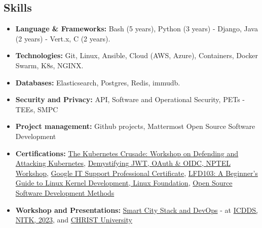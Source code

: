 \documentclass[a4paper,11pt]{article}
\begin{document}
\subsection*{Skills}
\begin{itemize}
\item  \textbf{Language \& Frameworks:} Bash (5 years), Python (3 years) - Django, Java (2 years) - Vert.x, C (2 years).
\item \textbf{Technologies:} Git, Linux, Ansible, Cloud (AWS, Azure), Containers, Docker Swarm, K8s,
NGINX.
\item \textbf{Databases:} Elasticsearch, Postgres, Redis, immudb.
\item \textbf{Security and Privacy:} API, Software and Operational Security, PETs - TEEs, SMPC 
\item  \textbf{Project management:} Github projects, Mattermost Open Source Software Development
\item \textbf{Certifications:} \href{https://www.linkedin.com/in/abhi5782-/details/certifications/}{The Kubernetes Crusade: Workshop on Defending and Attacking Kubernetes}, \href{https://elearn.nptel.ac.in/Ecertificate/?q=NPWS22369227122778}{Demystifying JWT, OAuth \& OIDC, NPTEL Workshop}, \href {https://www.youracclaim.com/badges/848a4c99-ab00-449f-afed-59bc88c6a0cd/linked_in_profile}{Google IT Support Professional Certificate}, \href{https://www.credly.com/badges/c2fbeef3-6d43-4213-af28-0f68dedd3334/linked_in_profile}{LFD103: A Beginner's Guide to Linux Kernel Development, Linux Foundation}, \href{https://www.coursera.org/account/accomplishments/certificate/TE3G9PXUEUTR}{Open Source Software Development Methods} 
\item \textbf{Workshop and Presentations:} \href{https://abhi4578.github.io/conf-meetups/workshops/smart-city-and-introduction-to-devops-workshop/}{Smart City Stack and DevOps} - at \href{https://icdds.org/smartcity.html}{ICDDS, NITK, 2023}, and \href{https://edu.ieee.org/in-cucs/events/smart-city-stack-and-devops/}{CHRIST University}
\end{itemize}
\end{document}
